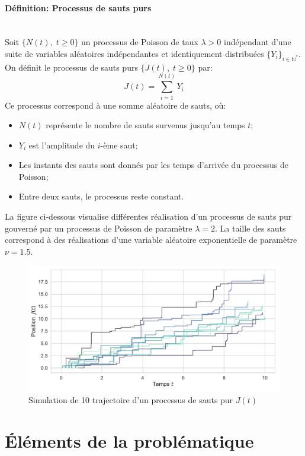 \paragraph{Définition: Processus de sauts purs}\mbox{}\\
Soit $\{N(t),\;t \geq 0\}$ un processus de Poisson de taux $\lambda > 0$ indépendant d'une suite de variables aléatoires indépendantes et identiquement distribuées $\{Y_i\}_{i \in \mathbb{N}^*}$. On définit le processus de sauts purs $\{J(t),\;t \geq 0\}$ par:
\[
J(t) = \sum_{i=1}^{N(t)} Y_i
\]
Ce processus correspond à une somme aléatoire de sauts, où:
\begin{itemize}
    \item $N(t)$ représente le nombre de sauts survenus jusqu'au temps $t$;
    \item $Y_i$ est l'amplitude du $i$-ème saut;
    \item Les instants des sauts sont donnés par les temps d'arrivée du processus de Poisson;
    \item Entre deux sauts, le processus reste constant.
\end{itemize}
La figure ci-dessous visualise différentes réalisation d'un processus de sauts pur gouverné par un processus de Poisson de paramètre $\lambda=2$. La taille des sauts correspond à des réalisations d'une variable aléatoire exponentielle de paramètre $\nu=1.5$.
\begin{figure}[htb]
    \centering
    \includegraphics[width=0.9\linewidth]{img/intro/path_jump.pdf}
    \caption{Simulation de 10 trajectoire d'un processus de sauts pur $J(t)$}\label{fig:TrajJump}
\end{figure}
\FloatBarrier\clearpage

\section{Éléments de la problématique}  %

